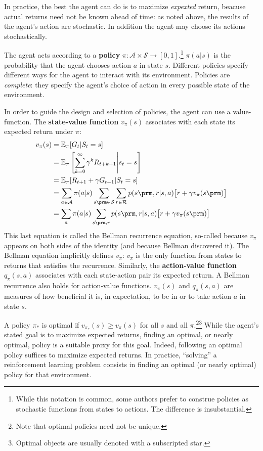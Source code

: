 \documentclass{my-tufte}
\begin{document}
In practice, the best the agent can do is to maximize \emph{expexted} return, beacuse actual returns need not be known ahead of time: as noted above, the results of the agent's action are stochastic.
In addition the agent may choose its actions stochastically.

The agent acts according to a \textbf{policy} $\pi : \mathcal A \times \mathcal S \rightarrow [0, 1]$.\footnote{While this notation is common, some authors prefer to construe policies as stochastic functions from states to actions. The difference is insubstantial.}
$\pi(a | s)$ is the probability that the agent chooses action $a$ in state $s$.
Different policies specify different ways for the agent to interact with its environment.
Policies are \emph{complete}: they specify the agent's choice of action in every possible state of the environment.

In order to guide the design and selection of policies, the agent can use a value-function.
The \textbf{state-value function} $v_\pi(s)$ associates with each state its expected return under $\pi$:
\begin{align*}
	v_\pi(s) &= \mathbb E_\pi[G_t | S_t = s]\\
					 &= \mathbb E_\pi \left [ \sum_{k=0}^\infty \gamma^k R_{t+k+1} \Bigg | s_t = s \right ]\\
					 &= \mathbb E_\pi [ R_{t+1} + \gamma G_{t+1} | S_t = s]\\
					 &= \sum_{a \in \mathcal A} \pi(a | s) \sum_{s \prm \in \mathcal S} \sum_{r \in \mathcal R}  p(s\prm, r | s, a) \big[r + \gamma v_\pi(s\prm) \big]\\
					 &= \sum_{a} \pi(a | s) \sum_{s \prm, r} p(s\prm, r | s, a) \big[r + \gamma v_\pi(s\prm) \big]
\end{align*}
This last equation is called the Bellman recurrence equation, so-called because $v_\pi$ appears on both sides of the identity (and because Bellman discovered it).
The Bellman equation implicitly defines $v_\pi$: $v_\pi$ is the only function from states to returns that satisfies the recurrence.
Similarly, the \textbf{action-value function} $q_\pi(s, a)$ associates with each state-action pair its expected return.
A Bellman recurrence also holds for action-value functions.
$v_\pi(s)$ and $q_\pi(s, a)$ are measures of how beneficial it is, in expectation, to be in or to take action $a$ in state $s$.

A policy $\pi_*$ is optimal if $v_{\pi_*}(s) \geq v_{\pi}(s)$ for all $s$ and all $\pi$.\footnote{Note that optimal policies need not be unique.}\footnote{Optimal objects are usually denoted with a subscripted star.}
While the agent's stated goal is to maximize expected returns, finding an optimal, or nearly optimal, policy is a suitable proxy for this goal.
Indeed, following an optimal policy suffices to maximize expected returns.
In practice, ``solving'' a reinforcement learning problem consists in finding an optimal (or nearly optimal) policy for that environment.
\end{document}
